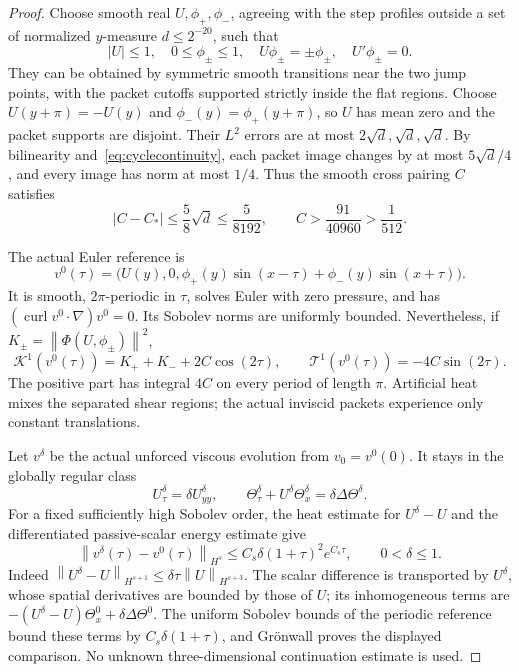 \documentclass[11pt]{article}
\newcommand{\norm}[1]{\left\lVert#1\right\rVert}
\newcommand{\curl}{\operatorname{curl}}
\begin{document}
\begin{proof}
Choose smooth real $U,\phi_+,\phi_-$, agreeing with the step profiles
outside a set of normalized $y$-measure $d\leq2^{-20}$, such that
\[
 |U|\leq1,\quad 0\leq\phi_\pm\leq1,\quad
 U\phi_\pm=\pm\phi_\pm,\quad U'\phi_\pm=0.
\]
They can be obtained by symmetric smooth transitions near the two jump
points, with the packet cutoffs supported strictly inside the flat
regions. Choose $U(y+\pi)=-U(y)$ and
$\phi_-(y)=\phi_+(y+\pi)$, so $U$ has mean zero and the packet supports
are disjoint. Their $L^2$ errors are at most $2\sqrt d,\sqrt d,\sqrt d$.
By bilinearity and~\eqref{eq:cyclecontinuity}, each packet image changes
by at most $5\sqrt d/4$, and every image has norm at most $1/4$.
Thus the smooth cross pairing $C$ satisfies
\[
 |C-C_*|\leq\frac58\sqrt d\leq\frac5{8192},
 \qquad C>\frac{91}{40960}>\frac1{512}.
\]

The actual Euler reference is
\[
 v^0(\tau)=\bigl(U(y),0,
       \phi_+(y)\sin(x-\tau)+\phi_-(y)\sin(x+\tau)\bigr).
\]
It is smooth, $2\pi$-periodic in $\tau$, solves Euler with zero pressure,
and has $(\curl v^0\cdot\nabla)v^0=0$. Its Sobolev norms are uniformly
bounded. Nevertheless, if $K_\pm=\norm{\Phi(U,\phi_\pm)}^2$,
\begin{equation}\label{eq:cycleformula}
 \mathcal K^1(v^0(\tau))=K_++K_-+2C\cos(2\tau),\qquad
 \mathcal T^1(v^0(\tau))=-4C\sin(2\tau).
\end{equation}
The positive part has integral $4C$ on every period of length $\pi$.
Artificial heat mixes the separated shear regions; the actual inviscid
packets experience only constant translations.

Let $v^\delta$ be the actual unforced viscous evolution from
$v_0=v^0(0)$. It stays in the globally regular class
\[
 U_\tau^\delta=\delta U_{yy}^\delta,\qquad
 \Theta_\tau^\delta+U^\delta\Theta_x^\delta
                       =\delta\Delta\Theta^\delta.
\]
For a fixed sufficiently high Sobolev order, the heat estimate for
$U^\delta-U$ and the differentiated passive-scalar energy estimate give
\begin{equation}\label{eq:cycleviscouscomparison}
 \norm{v^\delta(\tau)-v^0(\tau)}_{H^s}
       \leq C_s\delta(1+\tau)^2 e^{C_s\tau},\qquad 0<\delta\leq1.
\end{equation}
Indeed $\norm{U^\delta-U}_{H^{s+1}}\leq
\delta\tau\norm U_{H^{s+3}}$. The scalar difference is transported by
$U^\delta$, whose spatial derivatives are bounded by those of $U$;
its inhomogeneous terms are
$-(U^\delta-U)\Theta_x^0+\delta\Delta\Theta^0$.
The uniform Sobolev bounds of the periodic reference bound these terms
by $C_s\delta(1+\tau)$, and Gr\"onwall proves the displayed comparison.
No unknown three-dimensional continuation estimate is used.


\end{proof}
\end{document}
